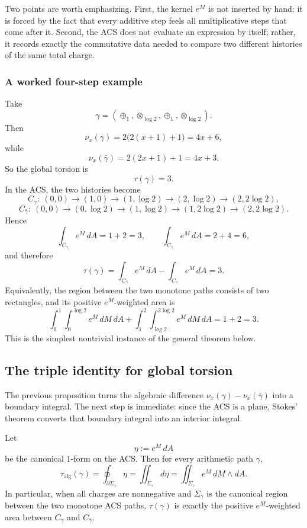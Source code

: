 Two points are worth emphasizing. First, the kernel $e^M$ is not inserted by hand: it is forced by the fact that every additive step feels all multiplicative steps that come after it. Second, the ACS does not evaluate an expression by itself; rather, it records exactly the commutative data needed to compare two different histories of the same total charge.

\subsubsection*{A worked four-step example}
Take
\[
    \gamma=(\oplus_1,\otimes_{\log 2},\oplus_1,\otimes_{\log 2}).
\]
Then
\[
    \nu_x(\gamma)=2\bigl(2(x+1)+1\bigr)=4x+6,
\]
while
\[
    \nu_x(\bar\gamma)=2(2x+1)+1=4x+3.
\]
So the global torsion is
\[
    \tau(\gamma)=3.
\]
In the ACS, the two histories become
\[
    C_\gamma:\ (0,0)\to(1,0)\to(1,\log 2)\to(2,\log 2)\to(2,2\log 2),
\]
\[
    C_{\bar\gamma}:\ (0,0)\to(0,\log 2)\to(1,\log 2)\to(1,2\log 2)\to(2,2\log 2).
\]
Hence
\[
    \int_{C_\gamma} e^M\,dA = 1+2=3,
    \qquad
    \int_{C_{\bar\gamma}} e^M\,dA = 2+4=6,
\]
and therefore
\[
    \tau(\gamma)=\int_{C_{\bar\gamma}} e^M\,dA-\int_{C_\gamma} e^M\,dA=3.
\]
Equivalently, the region between the two monotone paths consists of two rectangles, and its positive $e^M$-weighted area is
\[
    \int_0^1\int_0^{\log 2} e^M\,dM\,dA
    +
    \int_1^2\int_{\log 2}^{2\log 2} e^M\,dM\,dA
    =1+2=3.
\]
This is the simplest nontrivial instance of the general theorem below.

\subsection{The triple identity for global torsion}
\label{subsec:acs-triple-identity}

The previous proposition turns the algebraic difference $\nu_x(\gamma)-\nu_x(\bar\gamma)$ into a boundary integral. The next step is immediate: since the ACS is a plane, Stokes' theorem converts that boundary integral into an interior integral.

\begin{theorem}\label{thm:acs-triple-identity}
Let
\[
    \eta:=e^M\,dA
\]
be the canonical $1$-form on the ACS. Then for every arithmetic path $\gamma$,
\begin{equation}
    \tau_{\mathrm{alg}}(\gamma)
    =\oint_{\partial\Sigma_\gamma}\eta
    =\iint_{\Sigma_\gamma} d\eta
    =\iint_{\Sigma_\gamma} e^M\,dM\wedge dA.
    \label{eq:triple_identity_final_narrative_enhanced_acs_AM_lc}
\end{equation}
In particular, when all charges are nonnegative and $\Sigma_\gamma$ is the canonical region between the two monotone ACS paths, $\tau(\gamma)$ is exactly the positive $e^M$-weighted area between $C_\gamma$ and $C_{\bar\gamma}$.
\end{theorem}


